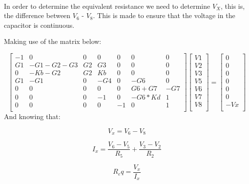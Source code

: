 \paragraph{}In order to determine the equivalent resistance we need to determine $V_X$, this is, the difference between $V_6$ - $V_8$. This is made to ensure that the voltage in the capacitor is continuous.

Making use of the matrix below:

\begin{equation}
\begin{bmatrix}
-1 & 0 & 0 & 0 & 0 & 0 & 0\\
G1 & -G1-G2-G3 & G2 & G3 & 0 & 0 & 0\\
0 & -Kb-G2 & G2 & Kb & 0 & 0 & 0\\
G1 & -G1 & 0 & -G4 & 0 & -G6 & 0\\
0 & 0 & 0 & 0 & 0 & G6+G7 & -G7\\
0 & 0 & 0 & -1 & 0 & -G6*Kd & 1\\
0 & 0 & 0 & 0 & -1 & 0 & 1\\
\end{bmatrix}
\begin{bmatrix}
V1\\
V2\\
V3\\
V5\\
V6\\
V7\\
V8\\
\end{bmatrix}
=
\begin{bmatrix}
0\\
0\\
0\\
0\\
0\\
0\\
-Vx\\
\end{bmatrix}
\end{equation}
\newpage
And knowing that:

\begin{equation}
	V_x = V_6 - V_8
\end{equation}

\begin{equation}
	I_x = \frac{V_6 - V_5}{R_5} + \frac{V_3 - V_2}{R_2}
\end{equation}

\begin{equation}
	R_eq = \frac{V_x}{I_x}
\end{equation}

